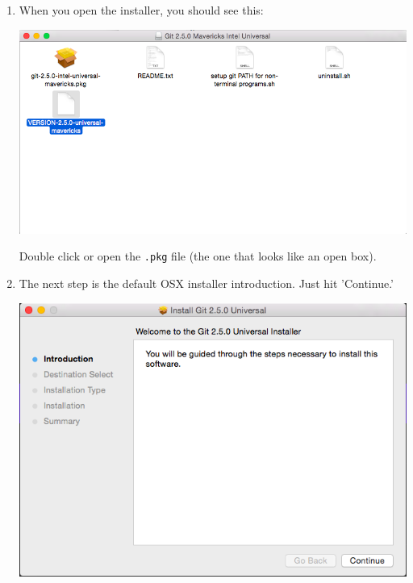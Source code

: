 \documentclass[11pt,fleqn]{article}
\theoremstyle{definition}
\begin{document}
\begin{enumerate}[Step 1.]
\item When you open the installer, you should see this:
\begin{center}
\includegraphics[scale=0.5]{gitmacinstall1.png}
\end{center}
Double click or open the \texttt{.pkg} file (the one that looks like an open box).

\newpage
\item The next step is the default OSX installer introduction. Just hit 'Continue.'
\begin{center}
\includegraphics[scale=0.5]{gitmacinstall2.png}
\end{center}


\end{enumerate}
\end{document}
